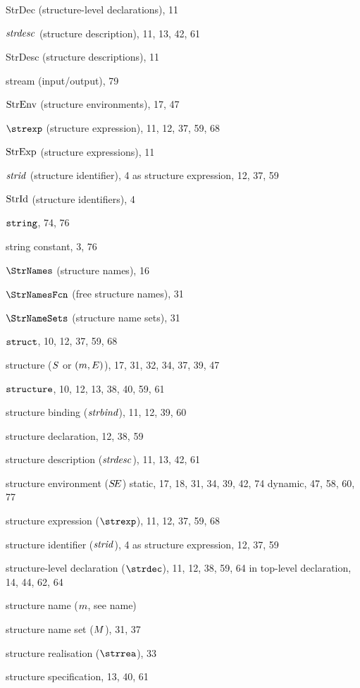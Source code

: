 \begin{theindex}
\item StrDec (structure-level declarations), 11
\item $\strdesc$ (structure description), 11, 13, 42, 61
\item StrDesc (structure descriptions), 11
\item stream (input/output), 79
\item $\StrEnv$ (structure environments), 17, 47
\item $\strexp$ (structure expression), 11, 12, 37, 59, 68
\item $\StrExp$ (structure expressions), 11
\item $\strid$ (structure identifier), 4
\subitem as structure expression, 12, 37, 59
\item $\StrId$ (structure identifiers), 4
\item $\STRING$, 74, 76
\item string constant, 3, 76
\item $\StrNames$ (structure names), 16
\item $\StrNamesFcn$ (free structure names), 31
\item $\StrNameSets$ (structure name sets), 31
\item $\STRUCT$, 10, 12, 37, 59, 68
\item structure ($\S$ or $(\m,\E)$), 17, 31, 32, 34, 37, 39, 47
\item $\STRUCTURE$, 10, 12, 13, 38, 40, 59, 61
\item structure binding ($\strbind$), 11, 12, 39, 60
\item structure declaration, 12, 38, 59
\item structure description ($\strdesc$), 11, 13, 42, 61
\item structure environment ($\SE$) 
\subitem static, 17, 18, 31, 34, 39, 42, 74
\subitem dynamic, 47, 58, 60, 77
\item structure expression ($\strexp$), 11, 12, 37, 59, 68
\item structure identifier ($\strid$), 4
\subitem as structure expression, 12, 37, 59
\item structure-level declaration ($\strdec$), 11, 12, 38, 59, 64
\subitem in top-level declaration, 14, 44, 62, 64
\item structure name ($\m$, see name) 
\item structure name set ($\M$), 31, 37
\item structure realisation ($\strrea$), 33
\item structure specification, 13, 40, 61

\end{theindex}

